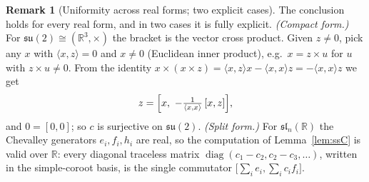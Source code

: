 \documentclass{amsart}
\theoremstyle{definition}
\newtheorem{remark}{Remark}
\begin{document}
\begin{remark}[Uniformity across real forms; two explicit cases]
The conclusion holds for every real form, and in two cases it is fully explicit.
\emph{(Compact form.)} For $\mathfrak{su}(2)\cong(\mathbb R^{3},\times)$ the
bracket is the vector cross product. Given $z\neq0$, pick any $x$ with
$\langle x,z\rangle=0$ and $x\neq0$ (Euclidean inner product), e.g.\ $x=z\times u$
for $u$ with $z\times u\neq0$. From the identity
$x\times(x\times z)=\langle x,z\rangle x-\langle x,x\rangle z=-\langle x,x\rangle z$
we get
\[
  z=\Bigl[x,\ -\tfrac{1}{\langle x,x\rangle}\,[x,z]\Bigr],
\]
and $0=[0,0]$; so $c$ is surjective on $\mathfrak{su}(2)$.
\emph{(Split form.)} For $\mathfrak{sl}_{n}(\mathbb R)$ the Chevalley generators
$e_i,f_i,h_i$ are real, so the computation of Lemma~\ref{lem:ssC} is valid over
$\mathbb R$: every diagonal traceless matrix
$\operatorname{diag}(c_1-c_2,c_2-c_3,\dots)$, written in the simple-coroot basis,
is the single commutator $\bigl[\sum_i e_i,\sum_i c_i f_i\bigr]$.
\end{remark}
\end{document}
